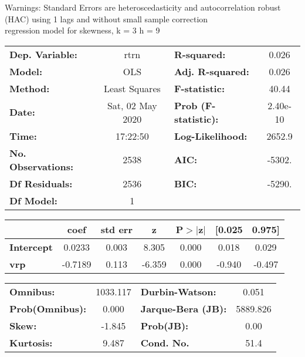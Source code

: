 Warnings: \newline
 [1] Standard Errors are heteroscedasticity and autocorrelation robust (HAC) using 1 lags and without small sample correction\\ 

regression model for skewness, k = 3 h = 9\begin{center}
\begin{tabular}{lclc}
\toprule
\textbf{Dep. Variable:}    &       rtrn       & \textbf{  R-squared:         } &     0.026   \\
\textbf{Model:}            &       OLS        & \textbf{  Adj. R-squared:    } &     0.026   \\
\textbf{Method:}           &  Least Squares   & \textbf{  F-statistic:       } &     40.44   \\
\textbf{Date:}             & Sat, 02 May 2020 & \textbf{  Prob (F-statistic):} &  2.40e-10   \\
\textbf{Time:}             &     17:22:50     & \textbf{  Log-Likelihood:    } &    2652.9   \\
\textbf{No. Observations:} &        2538      & \textbf{  AIC:               } &    -5302.   \\
\textbf{Df Residuals:}     &        2536      & \textbf{  BIC:               } &    -5290.   \\
\textbf{Df Model:}         &           1      & \textbf{                     } &             \\
\bottomrule
\end{tabular}
\begin{tabular}{lcccccc}
                   & \textbf{coef} & \textbf{std err} & \textbf{z} & \textbf{P$> |$z$|$} & \textbf{[0.025} & \textbf{0.975]}  \\
\midrule
\textbf{Intercept} &       0.0233  &        0.003     &     8.305  &         0.000        &        0.018    &        0.029     \\
\textbf{vrp}       &      -0.7189  &        0.113     &    -6.359  &         0.000        &       -0.940    &       -0.497     \\
\bottomrule
\end{tabular}
\begin{tabular}{lclc}
\textbf{Omnibus:}       & 1033.117 & \textbf{  Durbin-Watson:     } &    0.051  \\
\textbf{Prob(Omnibus):} &   0.000  & \textbf{  Jarque-Bera (JB):  } & 5889.826  \\
\textbf{Skew:}          &  -1.845  & \textbf{  Prob(JB):          } &     0.00  \\
\textbf{Kurtosis:}      &   9.487  & \textbf{  Cond. No.          } &     51.4  \\
\bottomrule
\end{tabular}
\end{center}

